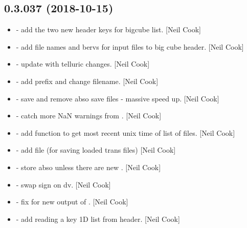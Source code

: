 \documentclass[a4paper,10pt,english]{report}
\begin{document}
\subsection{0.3.037 (2018-10-15)}
\label{\detokenize{misc/changelog:id294}}\begin{itemize}
\item {} 
 - add the two new header keys for bigcube list.
{[}Neil Cook{]}

\item {} 
 - add file names and bervs for input files to
big cube header. {[}Neil Cook{]}

\item {} 
 - update with telluric changes. {[}Neil Cook{]}

\item {} 
 - add prefix and change filename. {[}Neil Cook{]}

\item {} 
 - save and remove abso save files - massive speed up.
{[}Neil Cook{]}

\item {} 
 - catch more NaN warnings from . {[}Neil
Cook{]}

\item {} 
 - add  function to get most recent unix
time of list of files. {[}Neil Cook{]}

\item {} 
 - add  file (for saving loaded trans
files) {[}Neil Cook{]}

\item {} 
 - store abso unless there are new . {[}Neil
Cook{]}

\item {} 
 - swap sign on dv. {[}Neil Cook{]}

\item {} 
 - fix for new output of . {[}Neil Cook{]}

\item {} 
 - add reading a key 1D list from header. {[}Neil Cook{]}


\end{itemize}
\end{document}
